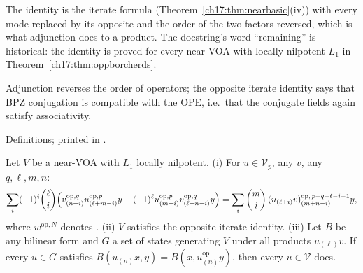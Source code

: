 \begin{dictionary}
The identity is the iterate formula (Theorem~\ref{ch17:thm:nearbasic}(iv)) with every mode replaced by its opposite and the
order of the two factors reversed, which is what adjunction does to a product.  The docstring's word ``remaining'' is
historical: the identity is proved for every near-VOA with locally nilpotent $L_1$ in
Theorem~\ref{ch17:thm:oppborcherds}.
\end{dictionary}

\begin{physics}
Adjunction reverses the order of operators; the opposite iterate identity says that BPZ conjugation is compatible with
the OPE, i.e.\ that the conjugate fields again satisfy associativity.
\end{physics}

\begin{status}
Definitions; printed in .
\end{status}

\begin{theorem}\label{ch17:thm:oppborcherds}
Let $V$ be a near-VOA with $L_1$ locally nilpotent.  (i) For $u\in\mathcal V_p$, any $v$, any $q,\ell,m,n$:
\begin{multline*}
\sum_i(-1)^i\binom\ell i\Bigl(v^{\mathrm{op},q}_{(n+i)}u^{\mathrm{op},p}_{(\ell+m-i)}y-(-1)^\ell u^{\mathrm{op},p}_{(m+i)}v^{\mathrm{op},q}_{(\ell+n-i)}y\Bigr)
=\sum_i\binom mi\,(u_{(\ell+i)}v)^{\mathrm{op},\,p+q-\ell-i-1}_{(m+n-i)}y,
\end{multline*}
where $w^{\mathrm{op},N}$ denotes .  (ii) $V$ satisfies the opposite iterate identity.
(iii) Let $B$ be any bilinear form and $G$ a set of states generating $V$ under all products $u_{(\ell)}v$.  If every $u\in G$
satisfies $B(u_{(n)}x,y)=B(x,u^{\mathrm{op}}_{(n)}y)$, then every $u\in\mathcal V$ does.
\end{theorem}

